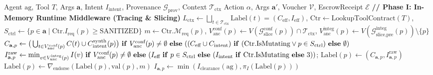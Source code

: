 \documentclass[conference,10pt]{IEEEtran}
\begin{document}
\renewcommand{\dbltopfraction}{0.95}
\renewcommand{\textfraction}{0.05}
\begin{algorithm*}[!t]
\caption{Composite Gateway Enforcement}
\label{alg:gateway}
\scriptsize
\begin{algorithmic}[1]
\REQUIRE Agent $\text{ag}$, Tool $T$, Args $\mathbf{a}$, Intent $I_{\text{intent}}$, Provenance $\mathcal{G}_{\text{prov}}$, Context $\mathcal{T}_{\text{ctx}}$
\ENSURE Action $\alpha$, Args $\mathbf{a}'$, Voucher $\mathcal{V}$, EscrowReceipt $\mathcal{E}$
\STATE \textbf{// Phase I: In-Memory Runtime Middleware (Tracing \& Slicing)}
\STATE $L_{\text{ctx}} \leftarrow \bigsqcup_{t \in \mathcal{T}_{\text{ctx}}} \text{Label}(t) = (C_{\text{eff}}, I_{\text{eff}})$, \quad $\text{Ctr} \leftarrow \text{LookupToolContract}(T)$, \quad $S_{\text{ctrl}} \leftarrow \{p \in \mathbf{a} \mid \text{Ctr}.I_{\text{req}}(p) \ge \text{SANITIZED}\}$
    \STATE $m \leftarrow \text{Ctr}.\mathcal{M}_{\text{req}}(p)$, \quad $V_{\text{anc}}^{\text{conf}}(p) \leftarrow V(\mathcal{G}_{\text{slice}}^{\text{conf}}(p)) \cap \mathcal{T}_{\text{ctx}}$, \quad $V_{\text{anc}}^{\text{integ}}(p) \leftarrow V(\mathcal{G}_{\text{slice,pre}}^{\text{integ}}(p)) \setminus \{p\}$
    \STATE $C_{\mathbf{a}, p} \leftarrow \big(\bigcup_{t \in V_{\text{anc}}^{\text{conf}}(p)} C(t) \cup C_{\text{intent}}^{\text{synth}}(p)\big) \text{ \textbf{if} } V_{\text{anc}}^{\text{conf}}(p) \ne \emptyset \text{ \textbf{else} } ((C_{\text{eff}} \cup C_{\text{intent}}) \text{ \textbf{if} } (\text{Ctr.IsMutating} \lor p \in S_{\text{ctrl}}) \text{ \textbf{else} } \emptyset)$
    \STATE $I_{\mathbf{a}, p}^{\text{raw}} \leftarrow \min_{v \in V_{\text{anc}}^{\text{integ}}(p)} I(v) \text{ \textbf{if} } V_{\text{anc}}^{\text{conf}}(p) \ne \emptyset \text{ \textbf{else} } (I_{\text{eff}} \text{ \textbf{if} } p \in S_{\text{ctrl}} \text{ \textbf{else} } (I_{\text{intent}} \text{ \textbf{if} } \text{Ctr.IsMutating} \text{ \textbf{else} } 3))$; \quad $\text{Label}(p) \leftarrow (C_{\mathbf{a}, p}, I_{\mathbf{a}, p}^{\text{raw}})$
        \STATE $\text{Label}(p) \leftarrow \nabla_{\text{endorse}}(\text{Label}(p), \text{val}(p), m)$
    \ENDIF
    \STATE $I_{\mathbf{a}, p} \leftarrow \min\left(I_{\text{clearance}}(\text{ag}), \pi_I(\text{Label}(p))\right)$
\ENDFOR
{}

\end{algorithmic}
\end{algorithm*}
\end{document}

